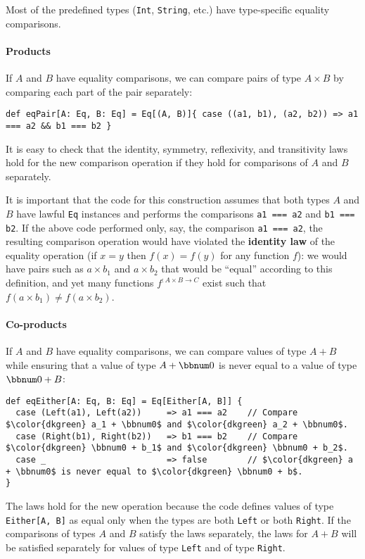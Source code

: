 Most of the predefined types (\lstinline!Int!, \lstinline!String!,
etc.) have type-specific equality comparisons.

\paragraph{Products}

If $A$ and $B$ have equality comparisons, we can compare pairs of
type $A\times B$ by comparing each part of the pair separately:
\begin{lstlisting}
def eqPair[A: Eq, B: Eq] = Eq[(A, B)]{ case ((a1, b1), (a2, b2)) => a1 === a2 && b1 === b2 }
\end{lstlisting}
It is easy to check that the identity, symmetry, reflexivity, and
transitivity laws hold for the new comparison operation if they hold
for comparisons of $A$ and $B$ separately.

It is important that the code for this construction assumes that both
types $A$ and $B$ have lawful \lstinline!Eq! instances and performs
the comparisons \lstinline!a1 === a2! and \lstinline!b1 === b2!.
If the above code performed only, say, the comparison \lstinline!a1 === a2!,
the resulting comparison operation would have violated the \textbf{identity
law} of the equality operation (if $x=y$ then $f(x)=f(y)$ for any
function $f$): we would have pairs such as $a\times b_{1}$ and $a\times b_{2}$
that would be \textsf{``}equal\textsf{''} according to this definition, and yet many
functions $f^{:A\times B\rightarrow C}$ exist such that $f(a\times b_{1})\neq f(a\times b_{2})$.

\paragraph{Co-products}

If $A$ and $B$ have equality comparisons, we can compare values
of type $A+B$ while ensuring that a value of type $A+\bbnum 0$ is
never equal to a value of type $\bbnum 0+B$:
\begin{lstlisting}[mathescape=true]
def eqEither[A: Eq, B: Eq] = Eq[Either[A, B]] {
  case (Left(a1), Left(a2))     => a1 === a2    // Compare $\color{dkgreen} a_1 + \bbnum0$ and $\color{dkgreen} a_2 + \bbnum0$.
  case (Right(b1), Right(b2))   => b1 === b2    // Compare $\color{dkgreen} \bbnum0 + b_1$ and $\color{dkgreen} \bbnum0 + b_2$.
  case _                        => false        // $\color{dkgreen} a + \bbnum0$ is never equal to $\color{dkgreen} \bbnum0 + b$.
}
\end{lstlisting}
The laws hold for the new operation because the code defines values
of type \lstinline!Either[A, B]! as equal only when the types are
both \lstinline!Left! or both \lstinline!Right!. If the comparisons
of types $A$ and $B$ satisfy the laws separately, the laws for $A+B$
will be satisfied separately for values of type \lstinline!Left!
and of type \lstinline!Right!.

